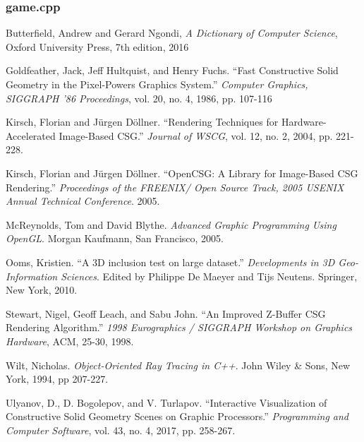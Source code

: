 \documentclass[12pt]{article}
\begin{document}
\begin{onehalfspace}
\subsubsection{game.cpp}
% 

\newpage
\begin{thebibliography}{10}
  Butterfield, Andrew and Gerard Ngondi,
  \textit{A Dictionary of Computer Science},
  Oxford University Press,
  7th edition,
  2016

  Goldfeather, Jack, Jeff Hultquist, and Henry Fuchs. ``Fast Constructive Solid Geometry in the Pixel-Powers Graphics System.'' {\it Computer Graphics, SIGGRAPH '86 Proceedings}, vol. 20, no. 4, 1986,
pp. 107-116
  
  Kirsch, Florian and J\"{u}rgen D\"{o}llner. ``Rendering Techniques for Hardware-Accelerated Image-Based CSG.'' {\it Journal of WSCG}, vol. 12, no. 2, 2004, pp. 221-228.

  Kirsch, Florian and J\"{u}rgen D\"{o}llner. ``OpenCSG: A Library for Image-Based CSG Rendering.'' {\it Proceedings of the FREENIX/ Open Source Track, 2005 USENIX Annual Technical Conference}. 2005.

  McReynolds, Tom and David Blythe. {\it Advanced Graphic Programming Using OpenGL}. Morgan Kaufmann, San Francisco, 2005.

  Ooms, Kristien. ``A 3D inclusion test on large dataset.'' {\it Developments in 3D Geo-Information Sciences}. Edited by Philippe De Maeyer and Tijs Neutens. Springer, New York, 2010.

  Stewart, Nigel, Geoff Leach, and Sabu John. ``An Improved Z-Buffer CSG Rendering Algorithm.'' {\it 1998 Eurographics / SIGGRAPH Workshop on Graphics Hardware}, ACM, 25-30, 1998.

  Wilt, Nicholas. {\it Object-Oriented Ray Tracing in C++}. John Wiley \& Sons, New York, 1994, pp 207-227.

  Ulyanov, D., D. Bogolepov, and V. Turlapov. ``Interactive Visualization of Constructive Solid Geometry Scenes on Graphic Processors.'' {\it Programming and Computer Software}, vol. 43, no. 4, 2017, pp. 258-267.
\end{thebibliography}
\end{onehalfspace}
\end{document}

